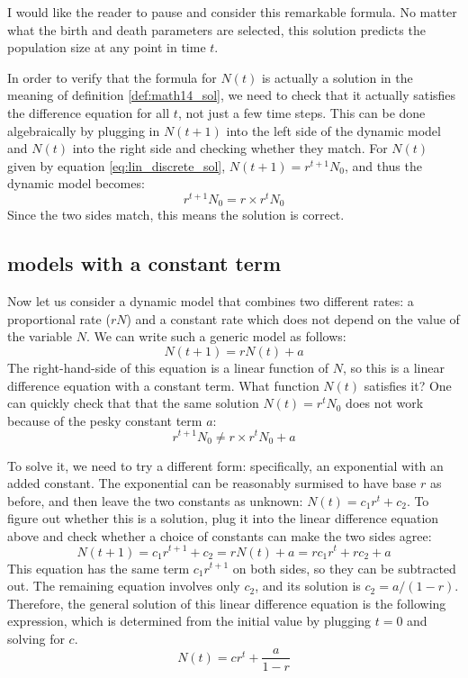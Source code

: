 \documentclass[
  letterpaper,
  DIV=11,
  numbers=noendperiod]{scrreprt}
\begin{document}
I would like the reader to pause and consider this remarkable formula.
No matter what the birth and death parameters are selected, this
solution predicts the population size at any point in time \(t\).

In order to verify that the formula for \(N(t)\) is actually a solution
in the meaning of definition \ref{def:math14_sol}, we need to check that
it actually satisfies the difference equation for all \(t\), not just a
few time steps. This can be done algebraically by plugging in \(N(t+1)\)
into the left side of the dynamic model and \(N(t)\) into the right side
and checking whether they match. For \(N(t)\) given by equation
\ref{eq:lin_discrete_sol}, \(N(t+1) = r^{t+1} N_0\), and thus the
dynamic model becomes: \[r^{t+1} N_0 = r \times r^t N_0\] Since the two
sides match, this means the solution is
correct.

\hypertarget{models-with-a-constant-term}{%
\subsection{models with a constant
term}\label{models-with-a-constant-term}}

Now let us consider a dynamic model that combines two different rates: a
proportional rate (\(rN\)) and a constant rate which does not depend on
the value of the variable \(N\). We can write such a generic model as
follows: \[ N(t+1) =  rN(t) + a \] The right-hand-side of this equation
is a linear function of \(N\), so this is a linear difference equation
with a constant term. What function \(N(t)\) satisfies it? One can
quickly check that that the same solution \(N(t) = r^t N_0\) does not
work because of the pesky constant term \(a\):
\[ r^{t+1} N_0 \neq r \times r^t N_0 + a\]

To solve it, we need to try a different form: specifically, an
exponential with an added constant. The exponential can be reasonably
surmised to have base \(r\) as before, and then leave the two constants
as unknown: \(N(t) = c_1 r^t + c_2\). To figure out whether this is a
solution, plug it into the linear difference equation above and check
whether a choice of constants can make the two sides agree:
\[  N(t+1) =  c_1 r^{t +1} + c_2 = rN(t) + a  = rc_1 r^t + rc_2+ a\]
This equation has the same term \(c_1 r^{t +1}\) on both sides, so they
can be subtracted out. The remaining equation involves only \(c_2\), and
its solution is \(c_2 = a/(1-r)\). Therefore, the general solution of
this linear difference equation is the following expression, which is
determined from the initial value by plugging \(t=0\) and solving for
\(c\). \begin{equation}
 N(t) = c r^t  + \frac{a}{1-r}
\label{eq:ch14_sol_wconst}
\end{equation}
\end{document}
